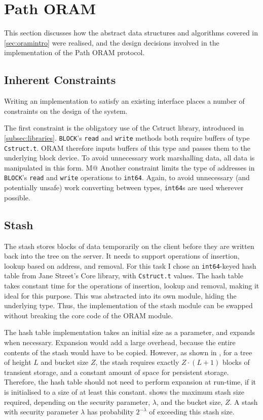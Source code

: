 \documentclass[12pt,a4paper,twoside,openright]{report}
\begin{document}
\section{Path ORAM}
\label{sec:pathORAM}

This section discusses how the abstract data structures and algorithms covered in \cref{sec:oramintro} were realised, and the design decisions involved in the implementation of the Path ORAM protocol.

\subsection{Inherent Constraints}
\label{subsec:constraints}

Writing an implementation to satisfy an existing interface places a number of constraints on the design of the system.

The first constraint is the obligatory use of the Cstruct library, introduced in \cref{subsec:libraries}. \texttt{BLOCK}'s \texttt{read} and \texttt{write} methods both require buffers of type \texttt{Cstruct.t}. ORAM therefore inputs buffers of this type and passes them to the underlying block device. To avoid unnecessary work marshalling data, all data is manipulated in this form.
M@
Another constraint limits the type of addresses in \texttt{BLOCK}'s \texttt{read} and \texttt{write} operations to \texttt{int64}. Again, to avoid unnecessary (and potentially unsafe) work converting between types, \texttt{int64}s are used wherever possible.

\subsection{Stash}
\label{subsec:stashImpl}

The stash stores blocks of data temporarily on the client before they are written back into the tree on the server. It needs to support operations of insertion, lookup based on address, and removal. For this task I chose an \texttt{int64}-keyed hash table from Jane Street's Core library, with \texttt{Cstruct.t} values. The hash table takes constant time for the operations of insertion, lookup and removal, making it ideal for this purpose. This was abstracted into its own module, hiding the underlying type. Thus, the implementation of the stash module can be swapped without breaking the core code of the ORAM module.

The hash table implementation takes an initial size as a parameter, and expands when necessary. Expansion would add a large overhead, because the entire contents of the stash would have to be copied. However, as shown in \citet{stefanov2013path}, for a tree of height $L$ and bucket size $Z$, the stash requires exactly $Z \cdot (L +1)$ blocks of transient storage, and a constant amount of space for persistent storage. Therefore, the hash table should not need to perform expansion at run-time, if it is initialised to a size of at least this constant.  shows the maximum stash size required, depending on the security parameter, $\lambda$, and the bucket size, $Z$. A stash with security parameter $\lambda$ has probability $2^{-\lambda}$ of exceeding this stash size.
\end{document}
